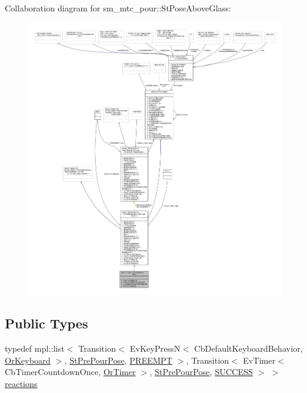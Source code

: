Collaboration diagram for sm\+\_\+mtc\+\_\+pour\+:\+:St\+Pose\+Above\+Glass\+:
\nopagebreak
\begin{figure}[H]
\begin{center}
\leavevmode
\includegraphics[width=350pt]{structsm__mtc__pour_1_1StPoseAboveGlass__coll__graph}
\end{center}
\end{figure}
\subsection*{Public Types}
\begin{DoxyCompactItemize}
\item 
typedef mpl\+::list$<$ Transition$<$ Ev\+Key\+PressN$<$ Cb\+Default\+Keyboard\+Behavior, \hyperlink{classsm__mtc__pour_1_1OrKeyboard}{Or\+Keyboard} $>$, \hyperlink{structsm__mtc__pour_1_1StPrePourPose}{St\+Pre\+Pour\+Pose}, \hyperlink{classPREEMPT}{P\+R\+E\+E\+M\+PT} $>$, Transition$<$ Ev\+Timer$<$ Cb\+Timer\+Countdown\+Once, \hyperlink{classsm__mtc__pour_1_1OrTimer}{Or\+Timer} $>$, \hyperlink{structsm__mtc__pour_1_1StPrePourPose}{St\+Pre\+Pour\+Pose}, \hyperlink{classSUCCESS}{S\+U\+C\+C\+E\+SS} $>$ $>$ \hyperlink{structsm__mtc__pour_1_1StPoseAboveGlass_aadc13c7d4daeb803f32078b3181ded27}{reactions}
\end{DoxyCompactItemize}
